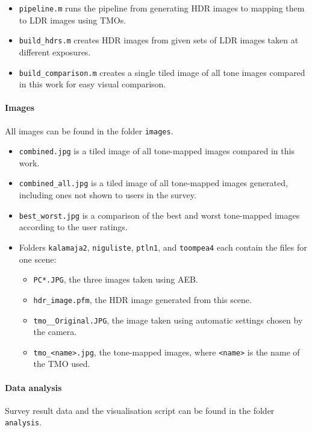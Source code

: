 \documentclass[a4paper]{scrartcl}
\begin{document}
\begin{itemize} 

\item \verb+pipeline.m+ runs the pipeline from generating HDR images to mapping them to LDR images using TMOs.
\item \verb+build_hdrs.m+ creates HDR images from given sets of LDR images taken at different exposures.
\item \verb+build_comparison.m+ creates a single tiled image of all tone images compared in this work for easy visual comparison.

\end{itemize}

\paragraph{Images} All images can be found in the folder \texttt{images}.

\begin{itemize}

\item \texttt{combined.jpg} is a tiled image of all tone-mapped images compared in this work.
\item \verb+combined_all.jpg+ is a tiled image of all tone-mapped images generated, including ones not shown to users in the survey.
\item \verb+best_worst.jpg+ is a comparison of the best and worst tone-mapped images according to the user ratings.
\item Folders \texttt{kalamaja2}, \texttt{niguliste}, \texttt{ptln1}, and \texttt{toompea4} each contain the files for one scene:
	\begin{itemize}
	\item \verb+PC*.JPG+, the three images taken using AEB.
	\item \verb+hdr_image.pfm+, the HDR image generated from this scene.
	\item \verb+tmo__Original.JPG+, the image taken using automatic settings chosen by the camera.
	\item \verb+tmo_<name>.jpg+, the tone-mapped images, where \texttt{<name>} is the name of the TMO used.
	\end{itemize}

\end{itemize}

\paragraph{Data analysis} Survey result data and the visualisation script can be found in the folder \texttt{analysis}.
\end{document}
